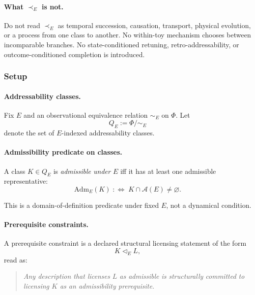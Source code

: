 \documentclass[aps,prx,onecolumn,11pt]{revtex4-2}
\theoremstyle{plain}
\theoremstyle{definition}
\theoremstyle{remark}
\begin{document}
\paragraph{What \(\prec_E\) is not.}

Do not read \(\prec_E\) as temporal succession, causation, transport,
physical evolution, or a process from one class to another. No
within-toy mechanism chooses between incomparable branches. No
state-conditioned retuning, retro-addressability, or
outcome-conditioned completion is introduced.

\subsubsection{Setup}
\label{toy:nontotal_ordering:setup}

\paragraph{Addressability classes.}

Fix \(E\) and an observational equivalence relation \(\sim_E\) on
\(\Phi\). Let
\[
Q_E := \Phi/{\sim_E}
\]
denote the set of \(E\)-indexed addressability classes.

\paragraph{Admissibility predicate on classes.}

A class \(K\in Q_E\) is \emph{admissible under \(E\)} iff it has at
least one admissible representative:
\begin{equation}
\mathrm{Adm}_E(K)
\;:\Longleftrightarrow\;
K\cap\mathcal A(E)\neq\varnothing.
\label{eq:toy_class_admissible}
\end{equation}

This is a domain-of-definition predicate under fixed \(E\), not a
dynamical condition.

\paragraph{Prerequisite constraints.}

A prerequisite constraint is a declared structural licensing statement
of the form
\[
K\triangleleft_E L,
\]
read as:
\begin{quote}
\emph{Any description that licenses \(L\) as admissible is structurally
committed to licensing \(K\) as an admissibility prerequisite.}
\end{quote}
\end{document}
